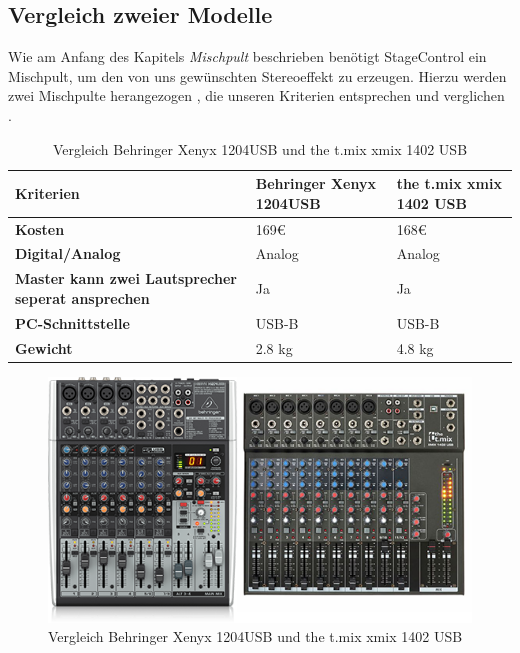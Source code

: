 \subsection{Vergleich zweier Modelle}
Wie am Anfang des Kapitels \textit{Mischpult} beschrieben benötigt StageControl ein Mischpult, um den von uns gewünschten Stereoeffekt zu erzeugen. Hierzu werden zwei Mischpulte herangezogen \parencite{MischpultKriterien1204}, die unseren Kriterien entsprechen und  verglichen  \parencite{MischpultKriterien1402}.

\begin{table} [H]
	\begin{tabular}{ |p{3.1cm} |p{4.8cm}|p{4.8cm}| }
		\hline
		\textbf{Kriterien} & \textbf{Behringer Xenyx 1204USB}& \textbf{the t.mix xmix 1402 USB}\\
		\hline
		\textbf{Kosten} & 169€ & 168€  \\ 
		\hline
		\textbf{Digital/Analog} & Analog & Analog   \\  
		\hline
		\textbf{Master kann zwei Lautsprecher seperat ansprechen} & Ja & Ja \\
		\hline
		\textbf{PC-Schnittstelle} & USB-B & USB-B  \\
		\hline
		\textbf{Gewicht}& 2.8 kg & 4.8 kg \\
		\hline	
	\end{tabular}
	\caption{Vergleich Behringer Xenyx 1204USB und the t.mix xmix 1402 USB} 
\end{table} 

\begin{figure}[H]
	\centering
	\includegraphics[width=0.8\linewidth]{images/the.t.mix.xmix1402-Behringer1204USB.png}
	\caption[Vergleich Behringer Xenyx 1204USB und the t.mix xmix 1402 USB]{Vergleich Behringer Xenyx 1204USB und the t.mix xmix 1402 USB}
	\label{fig:Behringer Xenyx 1204USB-the t.mix xmix 1402 USB}
\end{figure}

